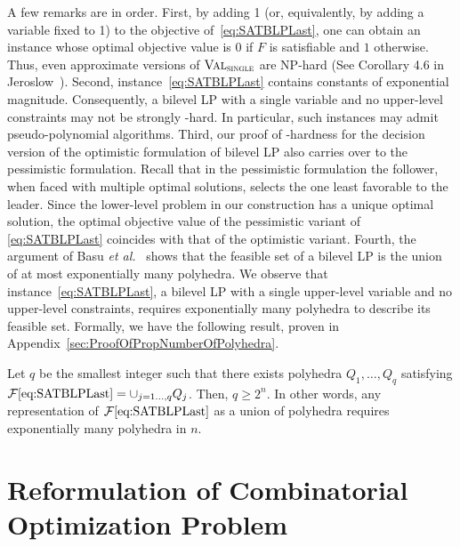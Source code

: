 \documentclass[runningheads,orivec]{llncs}
\newif\ifIPCOFlag
\newcommand{\IPCO}[2]{\ifIPCOFlag#1\else#2\fi}
\newcommand{\EtAl}{\textit{et al.}}
\newcommand{\MacroColor}[1]{#1}
\newcommand{\ComplexityClassStyle}[1]{#1}
\newcommand{\ClassNP}{\MacroColor{\text{\ComplexityClassStyle{NP}}}}
\newcommand{\ValueOfBLPWithSingleUpperLevelVariableName}{\MacroColor{$\textsc{Val}_{\textsc{single}}$}}
\newcommand{\ValueOfBLPWithSingleUpperLevelVariable}{\hyperref[ValueOfBLPWithSingleUpperLevelVariableAnchor]{\ValueOfBLPWithSingleUpperLevelVariableName{}}}
\newcommand{\FeasSolSet}{\MacroColor{\mathcal{F}}}
\newcommand{\SATBooleanFormula}{\MacroColor{F}}
\begin{document}
A few remarks are in order.
First, \label{Rev:Approximation} by adding 1 (or, equivalently, by adding a variable fixed to 1) to the objective of~\eqref{eq:SATBLPLast}, one can obtain an instance whose optimal objective value is $0$ if $\SATBooleanFormula$ is satisfiable and $1$ otherwise.
Thus, even approximate versions of \ValueOfBLPWithSingleUpperLevelVariable{} are $\ClassNP$-hard (See Corollary 4.6 in Jeroslow~\cite{Jeroslow1985}).
Second, instance~\eqref{eq:SATBLPLast} contains constants of exponential magnitude.  
Consequently, a bilevel LP with a single variable and no upper-level constraints may not be strongly \ClassNP{}-hard.
In particular, such instances may admit pseudo-polynomial algorithms.
\label{Rev:Pessimistic} Third, our proof of \ClassNP{}-hardness for the decision version of the optimistic formulation of bilevel LP also carries over to the pessimistic formulation. Recall that in the pessimistic formulation the follower, when faced with multiple optimal solutions, selects the one least favorable to the leader. Since the lower-level problem in our construction has a unique optimal solution, the optimal objective value of the pessimistic variant of \eqref{eq:SATBLPLast} coincides with that of the optimistic variant.
Fourth, the argument of Basu \EtAl{}~\cite{BasuEtAl2021} shows that the feasible set of a bilevel LP is the union of at most exponentially many polyhedra.
We observe that instance~\eqref{eq:SATBLPLast}, a bilevel LP with a single upper-level variable and no upper-level constraints, requires exponentially many polyhedra to describe its feasible set.
Formally, we have the following result, proven in \IPCO{the full version of the paper~\cite{sugishita2025complexitybilevellinearprogramming}}{Appendix~\ref{sec:ProofOfPropNumberOfPolyhedra}}.
\begin{proposition}
\label{prop:NumberOfPolyhedra}
Let $q$ be the smallest integer such that there exists polyhedra $Q_1, \ldots, Q_q$ satisfying $\FeasSolSet\eqref{eq:SATBLPLast} = \cup_{j = 1 \ldots, q} Q_j$.
Then, $q \ge 2^{n}$.
In other words, any representation of $\FeasSolSet\eqref{eq:SATBLPLast}$ as a union of polyhedra requires exponentially many polyhedra in $n$.
\end{proposition}

\section{Reformulation of Combinatorial Optimization Problem}
\label{sec:ImplicationOfTheorem}
\end{document}
